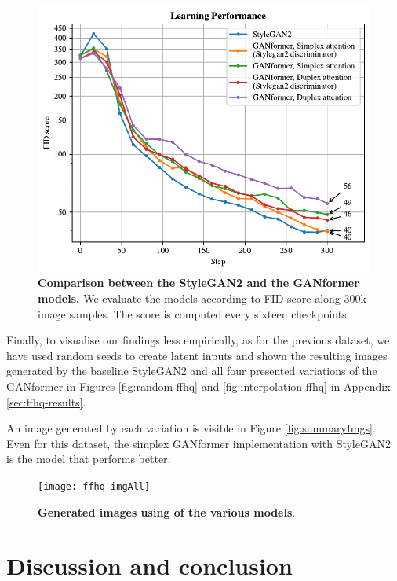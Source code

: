 \documentclass{article}
\begin{document}
\begin{figure}[htpb]				
	\centering
	\includegraphics[width=.7\linewidth]{FIDscore-ffhq.pdf}
	\caption{\textbf{Comparison between the StyleGAN2 and the GANformer models.} We evaluate 
	the models according to FID score along 300k image samples. The score is computed every 
	sixteen checkpoints.}
	\label{fig:performance-ffhq}
\end{figure}

Finally, to visualise our findings less empirically, as for the previous dataset, we have used random seeds to create latent inputs and shown the resulting images generated by the baseline StyleGAN2 and all four presented variations of the GANformer in Figures \ref{fig:random-ffhq} and \ref{fig:interpolation-ffhq} in Appendix \ref{sec:ffhq-results}.

An image generated by each variation is visible in Figure \ref{fig:summaryImgs}. Even for this dataset, the simplex GANformer implementation with StyleGAN2 is the model that performs better. 
\begin{figure}[htb]
	\centering
	\texttt{[image: ffhq-imgAll]}
	\caption{\textbf{Generated images using of the various models}.} 
	\label{fig:summaryImgs-ffhq}
\end{figure}


\section{Discussion and conclusion}
%	
\end{document}
